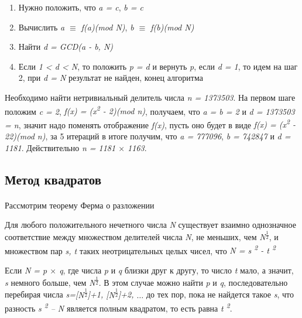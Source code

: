     \begin{enumerate}
     \item Нужно положить, что \textit{a = c}, \textit{b = c}
     \item Вычислить \textit{a {$\equiv$} f(a)(mod N)}, \textit{b {$\equiv$} f(b)(mod N)}
     \item Найти \textit{d = GCD(a - b, N)}
     \item Если \textit{1 < d < N}, то положить \textit{p = d} и вернуть \textit{p}, если \textit{d = 1}, то идем на шаг 2, при \textit{d = N} 
	результат не найден, конец алгоритма
    \end{enumerate}
  
  \begin{example}
    Необходимо найти нетривиальный делитель числа \textit{n = 1373503}. На первом шаге положим \textit{c = 2}, \textit{f(x) = (x\textsuperscript{2} - 2)(mod n)}, 
    получаем, что \textit{a = b = 2} и \textit{d = 1373503 = n}, значит надо поменять отображение \textit{f(x)}, пусть оно будет в виде 
    \textit{f(x) = (x\textsuperscript{2} - 22)(mod n)}, за 5 итераций в итоге получим, что \textit{a = 777096}, \textit{b = 742847} и \textit{d = 1181}. 
    Действительно \textit{n = 1181 {$\times$} 1163}.
  \end{example}  

\subsection{Метод квадратов}

\paragraph{} Рассмотрим теорему Ферма о разложении

  \begin{theorem}
    Для любого положительного нечетного числа \textit{N} существует взаимно однозначное соответствие между множеством делителей числа \textit{N}, 
    не меньших, чем \textit{N\textsuperscript{ {$\frac{1}{2}$}}}, и множеством пар \textit{{s, t}} таких неотрицательных целых чисел, что 
    \textit{N = s\textsuperscript{ 2} - t\textsuperscript{ 2}}
  \end{theorem}

  Если \textit{N = p {$\times$} q}, где числа \textit{p} и \textit{q} близки друг к другу, то число \textit{t} мало, а значит, \textit{s} немного больше,
  чем \textit{N\textsuperscript{ {$\frac{1}{2}$}}}. В этом случае можно найти \textit{p} и \textit{q}, последовательно перебирая числа
  \textit{s=[\textit{N\textsuperscript{ {$\frac{1}{2}$}}}]+1, [\textit{N\textsuperscript{ {$\frac{1}{2}$}}}]+2, {$\dots$}} до тех пор, пока не найдется 
  такое \textit{s}, что разность \textit{s\textsuperscript{ 2} – N} является полным квадратом, то есть равна \textit{t\textsuperscript{ 2}}.
  
